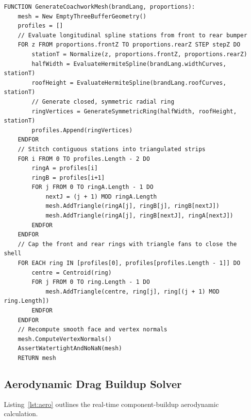 \documentclass[12pt,a4paper]{report}
\begin{document}
\begin{lstlisting}[language=pseudo,captionpos=t,basicstyle=\ttfamily\scriptsize,caption={Parametric Coachwork Lofting and Watertight Mesh Generation},label={lst:loft}]
FUNCTION GenerateCoachworkMesh(brandLang, proportions):
    mesh = New EmptyThreeBufferGeometry()
    profiles = []
    // Evaluate longitudinal spline stations from front to rear bumper
    FOR z FROM proportions.frontZ TO proportions.rearZ STEP stepZ DO
        stationT = Normalize(z, proportions.frontZ, proportions.rearZ)
        halfWidth = EvaluateHermiteSpline(brandLang.widthCurves, stationT)
        roofHeight = EvaluateHermiteSpline(brandLang.roofCurves, stationT)
        // Generate closed, symmetric radial ring
        ringVertices = GenerateSymmetricRing(halfWidth, roofHeight, stationT)
        profiles.Append(ringVertices)
    ENDFOR
    // Stitch contiguous stations into triangulated strips
    FOR i FROM 0 TO profiles.Length - 2 DO
        ringA = profiles[i]
        ringB = profiles[i+1]
        FOR j FROM 0 TO ringA.Length - 1 DO
            nextJ = (j + 1) MOD ringA.Length
            mesh.AddTriangle(ringA[j], ringB[j], ringB[nextJ])
            mesh.AddTriangle(ringA[j], ringB[nextJ], ringA[nextJ])
        ENDFOR
    ENDFOR
    // Cap the front and rear rings with triangle fans to close the shell
    FOR EACH ring IN [profiles[0], profiles[profiles.Length - 1]] DO
        centre = Centroid(ring)
        FOR j FROM 0 TO ring.Length - 1 DO
            mesh.AddTriangle(centre, ring[j], ring[(j + 1) MOD ring.Length])
        ENDFOR
    ENDFOR
    // Recompute smooth face and vertex normals
    mesh.ComputeVertexNormals()
    AssertWatertightAndNoNaN(mesh)
    RETURN mesh
\end{lstlisting}

\subsection{Aerodynamic Drag Buildup Solver}
Listing~\ref{lst:aero} outlines the real-time component-buildup aerodynamic calculation.
\end{document}
